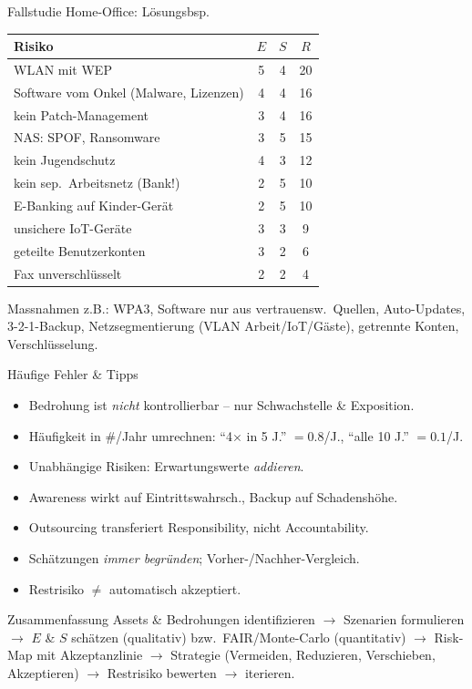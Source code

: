 \documentclass[a4paper, fontsize=7pt]{scrartcl}
\renewcommand*{\arraystretch}{1.5}  %
\begin{document}
\begin{subbox}{Fallstudie Home-Office: Lösungsbsp.}
\renewcommand*{\arraystretch}{1.1}
\begin{tabularx}{\linewidth}{@{}X|c|c|c@{}}
\textbf{Risiko} & $E$ & $S$ & $R$ \\
\hline
WLAN mit WEP & 5 & 4 & 20 \\
Software vom Onkel (Malware, Lizenzen) & 4 & 4 & 16 \\
kein Patch-Management & 3 & 4 & 16 \\
NAS: SPOF, Ransomware & 3 & 5 & 15 \\
kein Jugendschutz & 4 & 3 & 12 \\
kein sep.\ Arbeitsnetz (Bank!) & 2 & 5 & 10 \\
E-Banking auf Kinder-Gerät & 2 & 5 & 10 \\
unsichere IoT-Geräte & 3 & 3 & 9 \\
geteilte Benutzerkonten & 3 & 2 & 6 \\
Fax unverschlüsselt & 2 & 2 & 4 \\
\end{tabularx}
Massnahmen z.B.: WPA3, Software nur aus vertrauensw.\ Quellen, Auto-Updates,
3-2-1-Backup, Netzsegmentierung (VLAN Arbeit/IoT/Gäste), getrennte Konten,
Verschlüsselung.
\end{subbox}

\begin{subbox}{Häufige Fehler \& Tipps}
\begin{itemize}
    \item Bedrohung ist \emph{nicht} kontrollierbar -- nur Schwachstelle \&
          Exposition.
    \item Häufigkeit in \#/Jahr umrechnen: ``4$\times$ in 5 J.'' $= 0.8$/J.,
          ``alle 10 J.'' $= 0.1$/J.
    \item Unabhängige Risiken: Erwartungswerte \emph{addieren}.
    \item Awareness wirkt auf Eintrittswahrsch., Backup auf Schadenshöhe.
    \item Outsourcing transferiert Responsibility, nicht Accountability.
    \item Schätzungen \emph{immer begründen}; Vorher-/Nachher-Vergleich.
    \item Restrisiko $\neq$ automatisch akzeptiert.
\end{itemize}
\end{subbox}

\begin{subbox}{Zusammenfassung}
Assets \& Bedrohungen identifizieren $\to$ Szenarien formulieren $\to$ $E$
\& $S$ schätzen (qualitativ) bzw.\ FAIR/Monte-Carlo (quantitativ) $\to$ Risk-Map
mit Akzeptanzlinie $\to$ Strategie (Vermeiden, Reduzieren, Verschieben,
Akzeptieren) $\to$ Restrisiko bewerten $\to$ iterieren.
\end{subbox}
\end{document}
